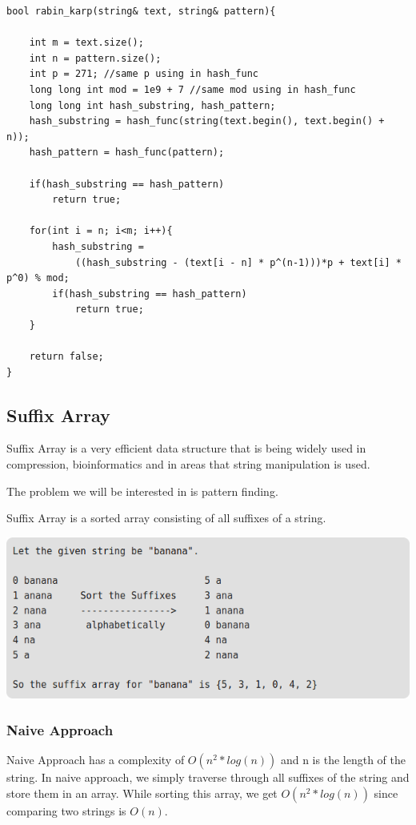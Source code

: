\documentclass[12pt]{article}
\begin{document}
        \begin{verbatim}
bool rabin_karp(string& text, string& pattern){

	int m = text.size();
	int n = pattern.size();
	int p = 271; //same p using in hash_func
	long long int mod = 1e9 + 7 //same mod using in hash_func
	long long int hash_substring, hash_pattern;
	hash_substring = hash_func(string(text.begin(), text.begin() + n));
	hash_pattern = hash_func(pattern);

	if(hash_substring == hash_pattern)
		return true;

	for(int i = n; i<m; i++){
		hash_substring = 
		    ((hash_substring - (text[i - n] * p^(n-1)))*p + text[i] * p^0) % mod;
		if(hash_substring == hash_pattern)
			return true;
	}

	return false;
}
    \end{verbatim}
        
        \subsection{Suffix Array}
        Suffix Array is a very efficient data structure that is being widely used in compression, bioinformatics and in areas that string manipulation is used. 
        
        The problem we will be interested in is pattern finding.
        
        Suffix Array is a sorted array consisting of all suffixes of a string.
        
        \includegraphics[width=\linewidth/2]{suffix_array1.png}
        
        
        \subsubsection{Naive Approach}
        
        Naive Approach has a complexity of $O(n^2 * log(n))$ and n is the length of the string. In naive approach, we simply traverse through all suffixes of the string and store them in an array. While sorting this array, we get $O(n^2 * log(n))$ since comparing two strings is $O(n)$.
        
\end{document}
